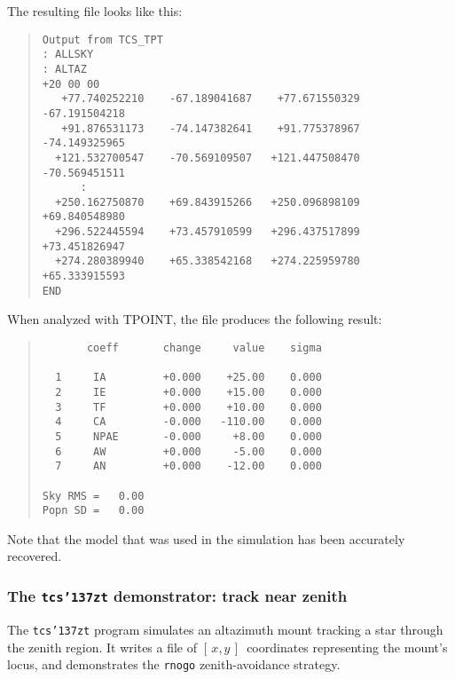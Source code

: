 \documentclass[12pt,fleqn,twoside]{article}
\renewcommand{\_}{{\tt\char'137}}     %
\newcommand{\xy}        {$[\,x,y\,]$}
\begin{document}
The resulting file looks like this:
\begin{quote}
\begin{small}
\begin{verbatim}
Output from TCS_TPT
: ALLSKY
: ALTAZ
+20 00 00
   +77.740252210    -67.189041687    +77.671550329    -67.191504218
   +91.876531173    -74.147382641    +91.775378967    -74.149325965
  +121.532700547    -70.569109507   +121.447508470    -70.569451511
      :
  +250.162750870    +69.843915266   +250.096898109    +69.840548980
  +296.522445594    +73.457910599   +296.437517899    +73.451826947
  +274.280389940    +65.338542168   +274.225959780    +65.333915593
END
\end{verbatim}\end{small}
\end{quote}
When analyzed with TPOINT, the file produces the following result:
\begin{quote}
\begin{small}
\begin{verbatim}
       coeff       change     value    sigma

  1     IA         +0.000    +25.00    0.000
  2     IE         +0.000    +15.00    0.000
  3     TF         +0.000    +10.00    0.000
  4     CA         -0.000   -110.00    0.000
  5     NPAE       -0.000     +8.00    0.000
  6     AW         +0.000     -5.00    0.000
  7     AN         +0.000    -12.00    0.000

Sky RMS =   0.00
Popn SD =   0.00
\end{verbatim}\end{small}
\end{quote}
Note that the model that was used in the simulation has been
accurately recovered.


\newpage
\subsubsection{The {\tt tcs\_zt} demonstrator: track near zenith}
\label{tcs_zt}

The {\tt tcs\_zt} program simulates an altazimuth mount tracking
a star through the zenith region.  It writes a file of \xy\
coordinates representing the mount's locus,
and demonstrates the {\tt rnogo} zenith-avoidance strategy.
\end{document}
